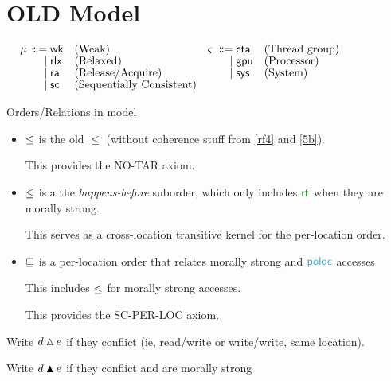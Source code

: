\section{OLD Model}

\begin{align*}
  \mu \;\mathrel{\mathord{\vcentcolon}\mkern-1mu\mathord{\vcentcolon}\mathord{{=}}}\;& {\mathsf{wk}} &&\text{{(Weak)}}                      &\varsigma \;\mathrel{\mathord{\vcentcolon}\mkern-1mu\mathord{\vcentcolon}\mathord{{=}}}\;& {\mathsf{cta}} &&\text{(Thread group)} &\hbox{$\;\mkern60mu\;$}&
  \\[-1ex] \;\mathrel{|}\;& {\mathsf{rlx}} &&\text{{(Relaxed)}}                & \;\mathrel{|}\;&{\mathsf{gpu}}   &&\text{(Processor)}                                   
  \\[-1ex] \;\mathrel{|}\;& {\mathsf{ra}} &&\text{{(Release/Acquire)}}         & \;\mathrel{|}\;&{\mathsf{sys}}  &&\text{(System)}                                         
  \\[-1ex] \;\mathrel{|}\;& {\mathsf{sc}} &&\text{{(Sequentially Consistent)}}    
\end{align*}

Orders/Relations in model
\begin{itemize}
\item $\trianglelefteq$ is the old $\le$ (without coherence stuff from \ref{rf4} and \ref{5b}).

  This provides the NO-TAR axiom.
\item $\le$ is a the \emph{happens-before} suborder, which only includes $\rrf$ when they are morally strong.

  This serves as a cross-location transitive kernel for the per-location order.
  
\item $\sqsubseteq$ is a per-location order that relates morally strong  and $\rpoloc$ accesses

  This includes $\le$ for  morally strong accesses.

  This provides the SC-PER-LOC axiom.

\end{itemize}

Write $d\mathbin{\vartriangle}e$ if they conflict (ie, read/write or write/write, same location).

Write $d\mathbin{\blacktriangle}e$ if they conflict and are morally strong

